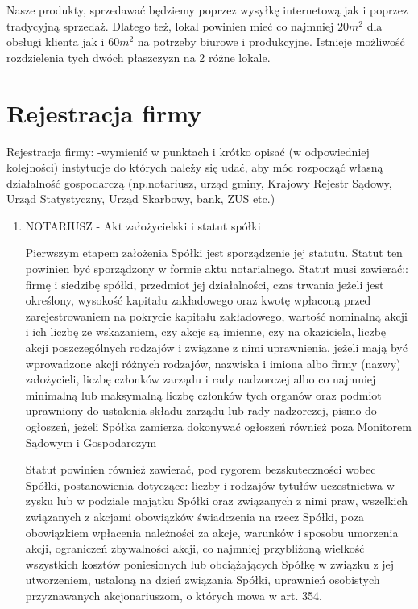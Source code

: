 \documentclass[a4paper, 11pt]{article}
\begin{document}
	Nasze produkty, sprzedawać będziemy poprzez wysyłkę internetową jak i poprzez tradycyjną sprzedaż.
Dlatego też, lokal powinien mieć co najmniej $20m^{2}$ dla obsługi klienta jak i $60m^{2}$ na potrzeby biurowe i produkcyjne. Istnieje możliwość rozdzielenia tych dwóch płaszczyzn na 2 różne lokale.
	
\section{Rejestracja firmy}
Rejestracja firmy:
-wymienić w punktach i krótko opisać (w odpowiedniej kolejności) instytucje do których należy się udać, aby móc rozpocząć własną działalność gospodarczą (np.notariusz, urząd gminy, Krajowy Rejestr Sądowy, Urząd Statystyczny, Urząd Skarbowy, bank, ZUS etc.)
\begin{enumerate}

\item NOTARIUSZ - Akt założycielski i statut spółki

Pierwszym etapem założenia Spółki jest sporządzenie jej statutu. Statut ten powinien być sporządzony w formie aktu notarialnego. Statut musi zawierać::
firmę i siedzibę spółki,
przedmiot jej działalności,
czas trwania jeżeli jest określony,
wysokość kapitału zakładowego oraz kwotę wpłaconą przed zarejestrowaniem na pokrycie kapitału zakładowego,
wartość nominalną akcji i ich liczbę ze wskazaniem, czy akcje są imienne, czy na okaziciela,
liczbę akcji poszczególnych rodzajów i związane z nimi uprawnienia, jeżeli mają być wprowadzone akcji różnych rodzajów,
nazwiska i imiona albo firmy (nazwy) założycieli,
liczbę członków zarządu i rady nadzorczej albo co najmniej minimalną lub maksymalną liczbę członków tych organów oraz podmiot uprawniony do ustalenia składu zarządu lub rady nadzorczej, pismo do ogłoszeń, jeżeli Spółka zamierza dokonywać ogłoszeń również poza Monitorem Sądowym i Gospodarczym

Statut powinien również zawierać, pod rygorem bezskuteczności wobec Spółki, postanowienia dotyczące:
liczby i rodzajów tytułów uczestnictwa w zysku lub w podziale majątku Spółki oraz związanych z nimi praw, wszelkich związanych z akcjami obowiązków świadczenia na rzecz Spółki, poza obowiązkiem wpłacenia należności za akcje,
warunków i sposobu umorzenia akcji,
ograniczeń zbywalności akcji,
co najmniej przybliżoną wielkość wszystkich kosztów poniesionych lub obciążających Spółkę w związku z jej utworzeniem, ustaloną na dzień związania 
Spółki, 
uprawnień osobistych przyznawanych akcjonariuszom, o których mowa w art. 354.



\end{enumerate}
\end{document}
